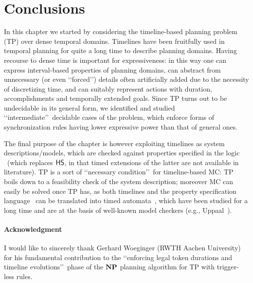 \section{Conclusions}
In this chapter we started by considering the
timeline-based planning problem (TP) over dense temporal domains.
Timelines have been fruitfully used in temporal planning for quite a long time to describe planning domains.
Having recourse to dense time is important for expressiveness: in this way one can express interval-based properties of planning domains, can abstract from unnecessary (or even \lq\lq forced\rq\rq) details often artificially added due to the necessity of discretizing time, and can suitably represent actions with duration, accomplishments and temporally extended goals.
Since TP turns out to be undecidable in its general form, 
we identified and studied \lq\lq intermediate\rq\rq\ decidable cases of the problem, which enforce 
forms of synchronization rules having lower expressive power than that of 
general ones.

The final purpose of the chapter is however exploiting timelines as system descriptions/models, 
which are checked against properties specified in the logic \MITL\ (which replaces $\text{\sffamily HS}$, in that timed extensions of the latter are not available in literature).
TP is a sort of \lq\lq necessary condition\rq\rq\ for timeline-based MC: 
TP boils down to a feasibility check of the system description; moreover MC can easily be solved once TP has, as both timelines and the property specification language \MITL\ can be translated into  timed automata~\cite{ALUR1994183}, which have been studied for a long time and are at the basis of well-known model checkers (e.g., Uppaal~\cite{UPP}).


\paragraph*{Acknowledgment} 
I would like to sincerely thank Gerhard Woeginger (RWTH Aachen University) for his fundamental contribution to the \lq\lq enforcing legal token durations and timeline evolutions\rq\rq\ phase of the $\textbf{NP}$ planning algorithm for TP with trigger-less rules.